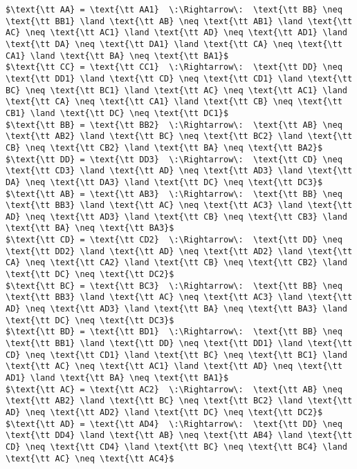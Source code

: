 \begin{lstlisting}[mathescape=true, caption=Output]
$\text{\tt AA} = \text{\tt AA1}  \:\Rightarrow\:  \text{\tt BB} \neq \text{\tt BB1} \land \text{\tt AB} \neq \text{\tt AB1} \land \text{\tt AC} \neq \text{\tt AC1} \land \text{\tt AD} \neq \text{\tt AD1} \land \text{\tt DA} \neq \text{\tt DA1} \land \text{\tt CA} \neq \text{\tt CA1} \land \text{\tt BA} \neq \text{\tt BA1}$
$\text{\tt CC} = \text{\tt CC1}  \:\Rightarrow\:  \text{\tt DD} \neq \text{\tt DD1} \land \text{\tt CD} \neq \text{\tt CD1} \land \text{\tt BC} \neq \text{\tt BC1} \land \text{\tt AC} \neq \text{\tt AC1} \land \text{\tt CA} \neq \text{\tt CA1} \land \text{\tt CB} \neq \text{\tt CB1} \land \text{\tt DC} \neq \text{\tt DC1}$
$\text{\tt BB} = \text{\tt BB2}  \:\Rightarrow\:  \text{\tt AB} \neq \text{\tt AB2} \land \text{\tt BC} \neq \text{\tt BC2} \land \text{\tt CB} \neq \text{\tt CB2} \land \text{\tt BA} \neq \text{\tt BA2}$
$\text{\tt DD} = \text{\tt DD3}  \:\Rightarrow\:  \text{\tt CD} \neq \text{\tt CD3} \land \text{\tt AD} \neq \text{\tt AD3} \land \text{\tt DA} \neq \text{\tt DA3} \land \text{\tt DC} \neq \text{\tt DC3}$
$\text{\tt AB} = \text{\tt AB3}  \:\Rightarrow\:  \text{\tt BB} \neq \text{\tt BB3} \land \text{\tt AC} \neq \text{\tt AC3} \land \text{\tt AD} \neq \text{\tt AD3} \land \text{\tt CB} \neq \text{\tt CB3} \land \text{\tt BA} \neq \text{\tt BA3}$
$\text{\tt CD} = \text{\tt CD2}  \:\Rightarrow\:  \text{\tt DD} \neq \text{\tt DD2} \land \text{\tt AD} \neq \text{\tt AD2} \land \text{\tt CA} \neq \text{\tt CA2} \land \text{\tt CB} \neq \text{\tt CB2} \land \text{\tt DC} \neq \text{\tt DC2}$
$\text{\tt BC} = \text{\tt BC3}  \:\Rightarrow\:  \text{\tt BB} \neq \text{\tt BB3} \land \text{\tt AC} \neq \text{\tt AC3} \land \text{\tt AD} \neq \text{\tt AD3} \land \text{\tt BA} \neq \text{\tt BA3} \land \text{\tt DC} \neq \text{\tt DC3}$
$\text{\tt BD} = \text{\tt BD1}  \:\Rightarrow\:  \text{\tt BB} \neq \text{\tt BB1} \land \text{\tt DD} \neq \text{\tt DD1} \land \text{\tt CD} \neq \text{\tt CD1} \land \text{\tt BC} \neq \text{\tt BC1} \land \text{\tt AC} \neq \text{\tt AC1} \land \text{\tt AD} \neq \text{\tt AD1} \land \text{\tt BA} \neq \text{\tt BA1}$
$\text{\tt AC} = \text{\tt AC2}  \:\Rightarrow\:  \text{\tt AB} \neq \text{\tt AB2} \land \text{\tt BC} \neq \text{\tt BC2} \land \text{\tt AD} \neq \text{\tt AD2} \land \text{\tt DC} \neq \text{\tt DC2}$
$\text{\tt AD} = \text{\tt AD4}  \:\Rightarrow\:  \text{\tt DD} \neq \text{\tt DD4} \land \text{\tt AB} \neq \text{\tt AB4} \land \text{\tt CD} \neq \text{\tt CD4} \land \text{\tt BC} \neq \text{\tt BC4} \land \text{\tt AC} \neq \text{\tt AC4}$

\end{lstlisting}
